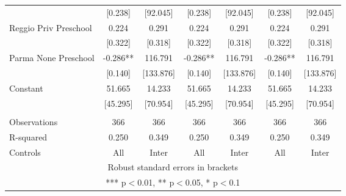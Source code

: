 \begin{tabular}{lcccccc}
 & [0.238] & [92.045] & [0.238] & [92.045] & [0.238] & [92.045] \\
Reggio Priv Preschool & 0.224 & 0.291 & 0.224 & 0.291 & 0.224 & 0.291 \\
 & [0.322] & [0.318] & [0.322] & [0.318] & [0.322] & [0.318] \\
Parma None Preschool & -0.286** & 116.791 & -0.286** & 116.791 & -0.286** & 116.791 \\
 & [0.140] & [133.876] & [0.140] & [133.876] & [0.140] & [133.876] \\
Constant & 51.665 & 14.233 & 51.665 & 14.233 & 51.665 & 14.233 \\
 & [45.295] & [70.954] & [45.295] & [70.954] & [45.295] & [70.954] \\
 &  &  &  &  &  &  \\
Observations & 366 & 366 & 366 & 366 & 366 & 366 \\
R-squared & 0.250 & 0.349 & 0.250 & 0.349 & 0.250 & 0.349 \\
 Controls & All & Inter & All & Inter & All & Inter \\ \hline
\multicolumn{7}{c}{ Robust standard errors in brackets} \\
\multicolumn{7}{c}{ *** p$<$0.01, ** p$<$0.05, * p$<$0.1} \\
\end{tabular}
